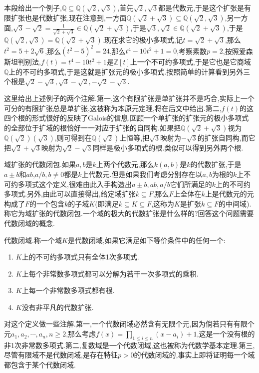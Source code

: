 本段给出一个例子,$\mathbb{Q}\subseteq \mathbb{Q}(\sqrt{2},\sqrt{3})$,首先$\sqrt{2},\sqrt{3}$都是代数元,于是这个扩张是有限扩张也是代数扩张,现在注意到,一方面$\mathbb{Q}(\sqrt{2}+\sqrt{3})\subseteq \mathbb{Q}(\sqrt{2},\sqrt{3})$,另一方面,$\sqrt{3}-\sqrt{2}=\frac{1}{\sqrt{2}+\sqrt{3}}\in \mathbb{Q}(\sqrt{2}+\sqrt{3})$,于是$\sqrt{3},\sqrt{2}\in \mathbb{Q}(\sqrt{2}+\sqrt{3})$,于是$\mathbb{Q}(\sqrt{2},\sqrt{3})=\mathbb{Q}(\sqrt{2}+\sqrt{3})$.现在求它的极小多项式,记$t=\sqrt{2}+\sqrt{3}$,那么$t^2=5+2\sqrt{6}$,那么$(t^2-5)^2=24$,那么$t^4-10t^2+1=0$,考察素数$p=2$,按照爱森斯坦判别法,$f(t)=t^4-10t^2+1$是$\mathbb{Z}[t]$上一个不可约多项式,于是它也是它商域$\mathbb{Q}$上的不可约多项式,于是这就是扩张元的极小多项式.按照简单的计算看到另外三个根是$\sqrt{2}-\sqrt{3},\sqrt{3}-\sqrt{2},-\sqrt{2}-\sqrt{3}$.

这里给出上述例子的两个注解.第一,这个有限扩张是单扩张并不是巧合,实际上一个可分的有限扩张总是单扩张,这被称为本原元定理,将在后文中给出.第二,$f(t)$的这四个根的形式很好的反映了Galois的信息.回顾一个单扩张的扩张元的极小多项式的全部位于扩域的根恰好一一对应于扩张的自同构.如果把$\mathbb{Q}(\sqrt{2}+\sqrt{3})$视为$\mathbb{Q}(\sqrt{2})(\sqrt{3})$,则可得到在$\mathbb{Q}(\sqrt{2})$上恒等,把$\sqrt{3}$映射为$-\sqrt{3}$的扩张自同构,而它把$\sqrt{2}+\sqrt{3}$映射为$\sqrt{2}-\sqrt{3}$同样是极小多项式的根.类似可以得到另外两个根.

域扩张的代数闭包.如果$a,b$是$k$上两个代数元,那么$k(a,b)$是$k$的代数扩张,于是$a\pm b$和$ab$,$a/b,b\not=0$都是$k$上代数元.但是如果我们考虑分别存在以$a,b$为根的$k$上不可约多项式这个定义,很难由此入手构造出$a\pm b,ab,a/b$它们所满足的$k$上的不可约多项式.另外,由此可以直接得出,给定域扩张$k\subseteq F$,那么$F$上全体在$k$上是代数元的元构成了$F$的一个包含$k$的子域$K$(即满足$k\subseteq K\subseteq F$,这称为$K$是扩张$k\subseteq F$的中间域).称它为域扩张的代数闭包.一个域的极大的代数扩张是什么样的?回答这个问题需要代数闭域的概念.

代数闭域.称一个域$K$是代数闭域,如果它满足如下等价条件中的任何一个:
\begin{enumerate}
	\item $K$上的不可约多项式只有全体1次多项式.
	\item $K$上每个非常数多项式都可以分解为若干一次多项式的乘积.
	\item $K$上每一个非常数多项式都有根.
	\item $K$没有非平凡的代数扩张.
\end{enumerate}

对这个定义做一些注解.第一,一个代数闭域必然含有无限个元,因为倘若只有有限个元$a_1,a_2,\cdots,a_n,n\ge2$,那么考虑$f(x)=\prod_{1\le i\le n}(x-a_i)+1$,这是一个没有根的非1次非常数多项式.第二,复数域是一个代数闭域,这也被称为代数学基本定理.第三,尽管有限域不是代数闭域,是存在特征$p>0$的代数闭域的,事实上即将证明每一个域都包含于某个代数闭域.

